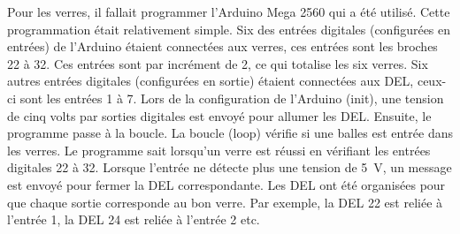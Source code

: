 Pour les verres, il fallait programmer l'Arduino Mega 2560 qui a été utilisé.
Cette programmation était relativement simple.
Six des entrées digitales (configurées en entrées) de l'Arduino étaient connectées aux verres, ces entrées sont les broches 22 à 32.
Ces entrées sont par incrément de 2, ce qui totalise les six verres.
Six autres entrées digitales (configurées en sortie) étaient connectées aux DEL, ceux-ci sont les entrées 1 à 7.
Lors de la configuration de l'Arduino (init), une tension de cinq volts par sorties digitales est envoyé pour allumer les DEL.
Ensuite, le programme passe à la boucle.
La boucle (loop) vérifie si une balles est entrée dans les verres.
Le programme sait lorsqu'un verre est réussi en vérifiant les entrées digitales 22 à 32.
Lorsque l'entrée ne détecte plus une tension de 5~V, un message est envoyé pour fermer la DEL correspondante.
Les DEL ont été organisées pour que chaque sortie corresponde au bon verre.
Par exemple, la DEL 22 est reliée à l’entrée 1, la DEL 24 est reliée à l’entrée 2 etc.

